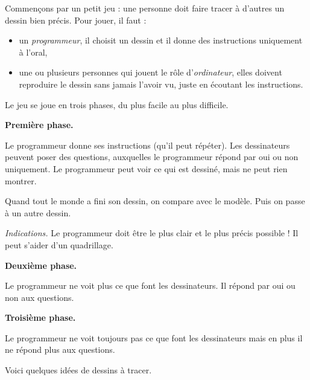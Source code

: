 \documentclass[class=report,crop=false, 12pt]{standalone}
\begin{document}



\begin{activite}
Commençons par un petit jeu : une personne doit faire tracer à d'autres un dessin bien précis.
Pour jouer, il faut :
\begin{itemize}
  \item un \emph{programmeur}, il choisit un dessin et il donne des instructions uniquement à l'oral,
  
  \item une ou plusieurs personnes qui jouent le rôle d'\emph{ordinateur}, elles doivent reproduire le dessin sans jamais l'avoir vu, juste en écoutant les instructions.
  
\end{itemize}


Le jeu se joue en trois phases, du plus facile au plus difficile. 

\bigskip

\textbf{Première phase.}

Le programmeur donne ses instructions (qu'il peut répéter). 
Les dessinateurs peuvent poser des questions, auxquelles 
le programmeur répond par oui ou non uniquement. Le programmeur peut voir ce qui est dessiné, 
mais ne peut rien montrer.

Quand tout le monde a fini son dessin, on compare avec le modèle. Puis on passe à un autre dessin.

\bigskip

\emph{Indications.} Le programmeur doit être le plus clair et le plus précis possible ! Il peut s'aider d'un quadrillage. 

\bigskip

\textbf{Deuxième phase.}

Le programmeur ne voit plus ce que font les dessinateurs. Il répond par oui ou non aux questions.

\bigskip

\textbf{Troisième phase.}

Le programmeur ne voit toujours pas ce que font les dessinateurs mais en plus il ne répond plus aux questions.

\bigskip
\bigskip

Voici quelques idées de dessins à tracer.

\end{activite}
\end{document}
